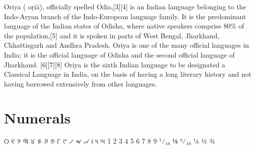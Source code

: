 Oriya ( oṛiā), officially spelled Odia,[3][4] is an Indian language belonging to the Indo-Aryan branch of the Indo-European language family. It is the predominant language of the Indian states of Odisha, where native speakers comprise 80\% of the population,[5] and it is spoken in parts of West Bengal, Jharkhand, Chhattisgarh and Andhra Pradesh. Oriya is one of the many official languages in India; it is the official language of Odisha and the second official language of Jharkhand. [6][7][8] Oriya is the sixth Indian language to be designated a Classical Language in India, on the basis of having a long literary history and not having borrowed extensively from other languages.




\section{Numerals}

{\oriya
\obeylines
୦	୧	୨	୩	୪	୫	୬	୭	୮	୯	୵	୶	୷	୲	୳	୴
{	1	2	3	4	5	6	7	8	9	¹⁄₁₆	⅛	³⁄₁₆	¼	½	¾}
}



